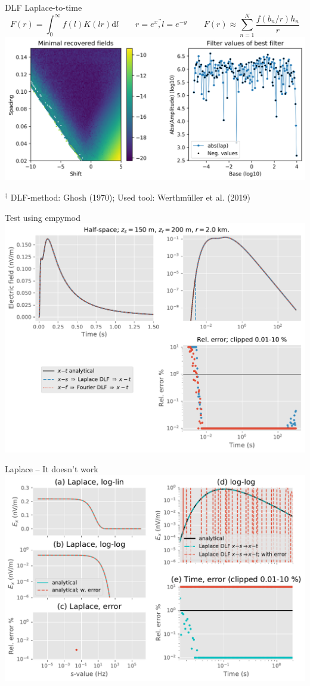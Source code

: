 \documentclass[xcolor=svgnames, aspectratio=169]{beamer}
\begin{document}
  \begin{frame}%
    {DLF Laplace-to-time}
    \vspace{-1em}
    \begin{equation}
      F(r) = \int^\infty_0 f(l)K(l r)\mathrm{d}l
      \qquad \underrightarrow{r = e^x, l = e^{-y}} \qquad
      F(r) \approx \sum^N_{n=1} \frac{f(b_n/r) h_n}{r}
      \nonumber
    \end{equation}
    \centering
      \includegraphics[width=.8\textwidth]{filter-space}

    {\tiny $^\dagger$ DLF-method: Ghosh (1970); Used tool: Werthmüller et al.
    (2019)}

  \end{frame}

  \begin{frame}%
    {Test using empymod }
    \centering
      \includegraphics[width=.7\textwidth]{s2tempymod}
  \end{frame}

  \begin{frame}%
    {Laplace -- It doesn't work}
    \centering
      \includegraphics[width=.8\textwidth]{s-t_time}
  \end{frame}
\end{document}
